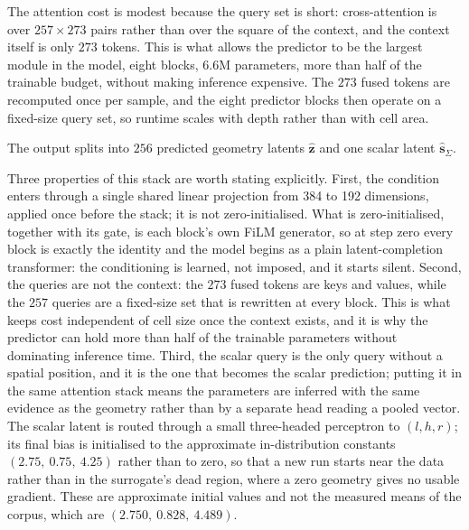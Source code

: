 \documentclass[pdflatex,oneside,sn-mathphys-num]{sn-jnl}
\theoremstyle{thmstyleone}
\theoremstyle{thmstyletwo}
\theoremstyle{thmstylethree}
\begin{document}
The attention cost is modest because the query set is short: cross-attention is
over $257\times273$ pairs rather than over the square of the context, and the
context itself is only $273$ tokens. This is what allows the predictor to be the
largest module in the model, eight blocks, $6.6$M parameters, more than half of
the trainable budget, without making inference expensive. The $273$ fused tokens
are recomputed once per sample, and the eight predictor blocks then operate on a
fixed-size query set, so runtime scales with depth rather than with cell area.

The output splits into $256$ predicted geometry latents $\hat{\mathbf{z}}$ and one
scalar latent $\hat{\mathbf{s}}_\Sigma$.

Three properties of this stack are worth stating explicitly. First, the condition enters
through a single shared linear projection from 384 to 192 dimensions, applied once before
the stack; it is not zero-initialised. What is zero-initialised, together with its gate, is
each block's own FiLM generator, so at step zero every block is exactly the identity and
the model begins as a plain latent-completion transformer: the conditioning is learned, not
imposed, and it starts silent. Second, the queries are not the context: the $273$ fused tokens
are keys and values, while the $257$ queries are a fixed-size set that is rewritten at
every block. This is what keeps cost independent of cell size once the context exists, and
it is why the predictor can hold more than half of the trainable parameters without
dominating inference time. Third, the scalar query is the only query without a spatial
position, and it is the one that becomes the scalar prediction; putting it in the same
attention stack means the parameters are inferred with the same evidence as the geometry
rather than by a separate head reading a pooled vector.
 The scalar latent is routed through a small
three-headed perceptron to $(l,h,r)$; its final bias is initialised to the approximate
in-distribution constants $(2.75,\ 0.75,\ 4.25)$ rather than to zero, so that a new run
starts near the data rather than in the surrogate's dead region, where a zero geometry
gives no usable gradient. These are approximate initial values and not the measured means
of the corpus, which are $(2.750,\ 0.828,\ 4.489)$.
\end{document}

